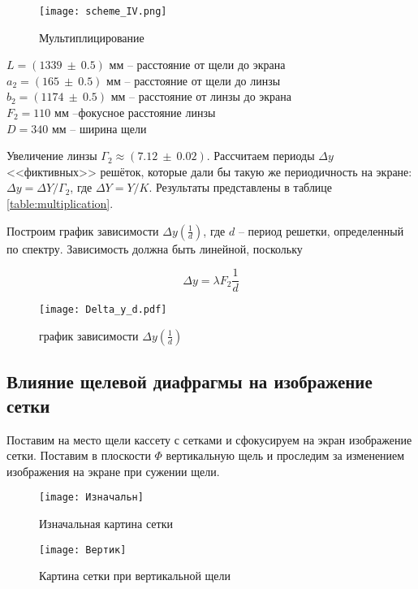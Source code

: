     
    
    \begin{figure}[h!]
    	\centering
    	\texttt{[image: scheme\_IV.png]}
    	\caption{Мультиплицирование}
    \end{figure}

	\begin{center}
		$L = (1339 ~ \pm ~ 0.5)$ мм -- расстояние от щели до экрана \\
		$a_2 = (165 ~ \pm ~ 0.5)$ мм -- расстояние от щели до линзы \\
		$b_2 = (1174 ~ \pm ~ 0.5)$ мм -- расстояние от линзы до экрана \\
		$F_2 = 110$ мм --фокусное расстояние линзы \\
		$D = 340$ мм -- ширина щели
	\end{center}

	Увеличение линзы $\Gamma_2 \approx (7.12 ~ \pm ~ 0.02)$. Рассчитаем периоды $\Delta y$ <<фиктивных>> решёток, которые дали бы такую же периодичность на экране: $\Delta y=\Delta Y / \Gamma_{2}$, где $\Delta Y=Y / K .$ Результаты представлены в таблице \ref{table:multiplication}.
	
	Построим график зависимости $\Delta y(\frac{1}{d})$, где $d$ -- период решетки, определенный по спектру. Зависимость должна быть линейной, поскольку
	
	\begin{equation}
		\Delta y = \lambda F_2 \frac{1}{d}
	\end{equation} 
	
	
	
	\begin{figure}[h!]
		\centering
		\texttt{[image: Delta\_y\_d.pdf]}
		\caption{график зависимости $\Delta y(\frac{1}{d})$}
	\end{figure}

	\subsection{Влияние щелевой диафрагмы на изображение сетки}

	Поставим на место щели кассету с сетками и сфокусируем на экран изображение сетки. 
	Поставим в плоскости $\Phi$ вертикальную щель и проследим за изменением изображения на экране при сужении щели.

    \begin{figure}[h!]
        \begin{center}
            \begin{minipage}[h!]{0.48\linewidth}
				\centering
                \texttt{[image: Изначальн]}
				\caption{Изначальная картина сетки}
            \end{minipage}
            \hfill
            \begin{minipage}[h!]{0.48\linewidth}
				\centering
                \texttt{[image: Вертик]}
	  			\caption{Картина сетки при вертикальной щели}
            \end{minipage}
        \end{center}
    \end{figure}

